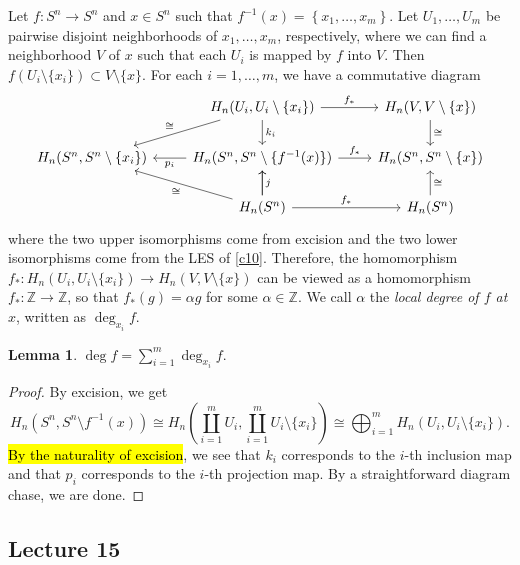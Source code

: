 \documentclass[10pt,letterpaper,cm]{nupset}
\theoremstyle{definition}
\theoremstyle{theorem}
\newtheorem{lemma}[definition]{Lemma}
\theoremstyle{remark}
\newcommand{\Z}{\mathbb Z}
\newcommand{\1}{\mathbb{1}}
\newcommand{\0}{\vec 0}
\begin{document}
\smallskip

Let $f: S^n \to S^n$ and $x\in S^n$ such that $f^{-1}(x)= \left\{x_1, \ldots, x_m\right\}$. Let $U_1, \ldots, U_m$ be pairwise disjoint neighborhoods of $x_1, \ldots, x_m$, respectively, where we can find a neighborhood $V$ of $x$ such that each $U_i$ is mapped by $f$ into $V$. Then $f(U_i \setminus \{x_i\}) \subset V \setminus \{x\}$. For each $i=1, \ldots, m$, we have a commutative diagram
\[
\begin{tikzcd}
                                 & {H_n(U_i, U_i \setminus \{x_i\})} \arrow[ld, "\cong"'] \arrow[d, "k_i"] \arrow[r, "f_{\ast}"] & {H_n(V, V\setminus \{x\})} \arrow[d, "\cong"] \\
{H_n(S^n, S^n\setminus \{x_i\})} & {H_n(S^n, S^n \setminus \{f^{-1}(x)\})} \arrow[r, "f_{\ast}"] \arrow[l, "p_i"]                & {H_n(S^n, S^n \setminus \{x\})}               \\
                                 & H_n(S^n) \arrow[lu, "\cong"] \arrow[u, "j"'] \arrow[r, "f_{\ast}"] \arrow[u]                  & H_n(S^n) \arrow[u, "\cong"']                 
\end{tikzcd}
\] where the two upper isomorphisms come from excision and the two lower isomorphisms come from the LES of \cref{c10}. Therefore, the homomorphism $f_{\ast} : H_n(U_i, U_i \setminus \{x_i\}) \to H_n(V, V\setminus \{x\})$ can be viewed as a homomorphism $f_{\ast} : \Z \to \Z$, so that $f_{\ast}(g) = \alpha g$ for some $\alpha \in \Z$. We call $\alpha$ the \textit{local degree of $f$ at $x$}, written as $\deg_{x_i}{f}$.


\begin{lemma}
$\deg{f}  = \sum_{i=1}^m \deg_{x_i}{f}$.
\end{lemma}
\begin{proof}
By excision, we get $$H_n(S^n, S^n \setminus f^{-1}(x)) \cong H_n\left(\coprod_{i=1}^m U_i,  \coprod_{i=1}^m U_i \setminus \{x_i\}\right) \cong \bigoplus_{i=1}^m H_n(U_i, U_i \setminus \{x_i\}).$$ \hl{By the naturality of excision}, we see that $k_i$ corresponds to the $i$-th inclusion map and that $p_i$ corresponds to the $i$-th projection map. By a straightforward diagram chase, we are done.
\end{proof}

\subsection{Lecture 15}
\end{document}
